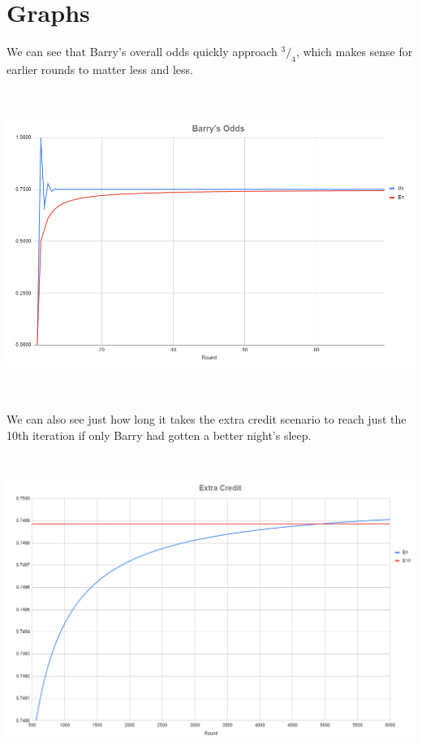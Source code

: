 \documentclass[10pt, letterpaper]{article}
\newcommand*\rfrac[2]{{}^{#1}\!/_{#2}}
\begin{document}
\pagebreak
\section*{Graphs}

We can see that Barry's overall odds quickly approach $\rfrac{3}{4}$, which makes sense for earlier rounds to matter less and less.

\includegraphics[height=10cm]{sorting_hat_01.png}

We can also see just how long it takes the extra credit scenario to reach just the 10th iteration if only Barry had gotten a better night's sleep.

\includegraphics[height=10cm]{sorting_hat_02.png}
\end{document}
